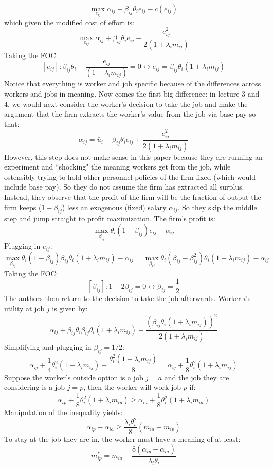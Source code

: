 \documentclass{article}
\begin{document}
\[\max_{e_{ij}} \alpha_{ij}+ \beta_{ij} \theta_i e_{ij} - c(e_{ij} )\]
which given the modified cost of effort is:
\[\max_{e_{ij}} \alpha_{ij}+ \beta_{ij}\theta_i  e_{ij} - \frac{e_{ij}^2}{2(1+\lambda_i m_{ij})}\]
Taking the FOC:
\[[e_{ij}]: \beta_{ij}\theta_i -\frac{e_{ij}}{(1+\lambda_i m_{ij})} = 0 \leftrightarrow e_{ij} =  \beta_{ij}\theta_i (1+\lambda_i m_{ij} ) \]
Notice that everything is worker and job specific because of the differences across workers and jobs in meaning. Now comes the first big difference: in lecture 3 and 4, we would next consider the worker's decision to take the job and make the argument that the firm extracts the worker's value from the job via base pay so that:
\[ \alpha_{ij} = \bar u_i -\beta_{ij} \theta_i e_{ij} + \frac{e_{ij}^2}{2(1+\lambda_i m_{ij})} \]
However, this step does not make sense in this paper because they are running an experiment and ``shocking" the meaning workers get from the job, while ostensibly trying to hold other personnel policies of the firm fixed (which would include base pay). So they do not assume the firm has extracted all surplus. Instead, they observe that the profit of the firm will be the fraction of output the firm keeps ($1-\beta_{ij}$) less an exogenous (fixed) salary $\alpha_{ij}$. So they skip the middle step and jump straight to profit maximization. The firm's profit is:
\[\max_{\beta_{ij}} \theta_i (1-\beta_{ij}) e_{ij} - \alpha_{ij} \]
Plugging in $e_{ij}$:
\[\max_{\beta_{ij}} \theta_i (1-\beta_{ij}) \beta_{ij}\theta_i (1+\lambda_i m_{ij} ) - \alpha_{ij}= \max_{\beta_{ij}} \theta_i (\beta_{ij}-\beta_{ij}^2) \theta_i (1+\lambda_i m_{ij} ) - \alpha_{ij}\]
Taking the FOC:
\[[\beta_{ij}]: 1-2\beta_{ij}=0 \leftrightarrow \beta_{ij}=\frac{1}{2} \]
The authors then return to the decision to take the job afterwards. Worker $i$'s utility at job $j$ is given by:
\[\alpha_{ij}+ \beta_{ij}\theta_i  \beta_{ij}\theta_i (1+\lambda_i m_{ij} ) - \frac{(\beta_{ij}\theta_i (1+\lambda_i m_{ij} ))^2}{2(1+\lambda_i m_{ij})}\]
Simplifying and plugging in $\beta_{ij}=1/2$:
\[\alpha_{ij}+ \frac{1}{4}\theta_i^2 (1+\lambda_i m_{ij} ) - \frac{\theta_i^2 (1+\lambda_i m_{ij} )}{8}=\alpha_{ij}+ \frac{1}{8}\theta_i^2 (1+\lambda_i m_{ij} )\]
Suppose the worker's outside option is a job $j=a$ and the job they are considering is a job $j=p$, then the worker will work job $p$ if:
\[\alpha_{ip}+ \frac{1}{8}\theta_i^2 (1+\lambda_i m_{ip} ) \geq \alpha_{ia}+ \frac{1}{8}\theta_i^2 (1+\lambda_i m_{ia} )\]
Manipulation of the inequality yields:
\[\alpha_{ip} -\alpha_{ia} \geq \frac{\lambda_i \theta_i^2}{8} (m_{ia}-m_{ip}) \]
To stay at the job they are in, the worker must have a meaning of at least:
\[m_{ip}^* = m_{ia}-\frac{8(\alpha_{ip}-\alpha_{ia})}{\lambda_i \theta_i} \]
\end{document}
